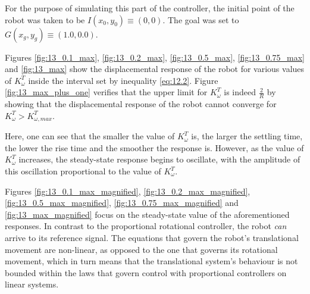 For the purpose of simulating this part of the controller, the initial point of
the robot was taken to be $I(x_0, y_0) \equiv (0, 0)$. The goal was set to
$G(x_g, y_g) \equiv (1.0, 0.0)$.

Figures \ref{fig:13_0.1_max}, \ref{fig:13_0.2_max}, \ref{fig:13_0.5_max},
\ref{fig:13_0.75_max} and \ref{fig:13_max} show the displacemental response of
the robot for various values of $K_{\omega}^T$ inside the interval set by
inequality \ref{eq:12.2}. Figure \ref{fig:13_max_plus_one} verifies that the
upper limit for $K_{\omega}^T$ is indeed $\frac{2}{R}$ by showing that the
displacemental response of the robot cannot converge for
$K_{\omega}^T > K_{\omega,max}^T$.

Here, one can see that the smaller the value of $K_{\omega}^T$ is, the larger
the settling time, the lower the rise time and the smoother the response is.
However, as the value of $K_{\omega}^T$ increases, the steady-state response
begins to oscillate, with the amplitude of this oscillation proportional to the
value of $K_{\omega}^T$.

Figures \ref{fig:13_0.1_max_magnified}, \ref{fig:13_0.2_max_magnified},
\ref{fig:13_0.5_max_magnified}, \ref{fig:13_0.75_max_magnified} and
\ref{fig:13_max_magnified} focus on the steady-state value of the aforementioned
responses. In contrast to the proportional rotational controller, the robot
\textit{can} arrive to its reference signal. The equations that govern the
robot's translational movement are non-linear, as opposed to the one that
governs its rotational movement, which in turn means that the translational
system's behaviour is not bounded within the laws that govern control with
proportional controllers on linear systems.


\noindent{}

